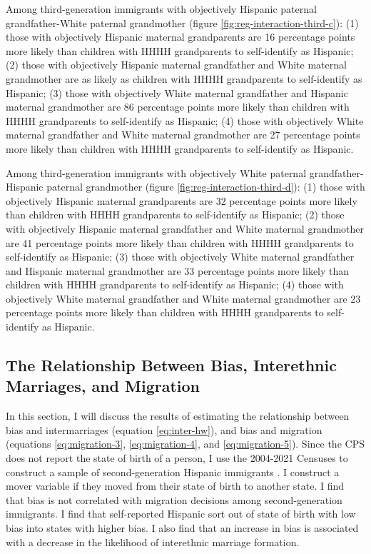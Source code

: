 \documentclass[12pt, fullpage]{article}
\begin{document}
Among third-generation immigrants with objectively Hispanic paternal grandfather-White paternal grandmother (figure \ref{fig:reg-interaction-third-c}): (1) those with objectively Hispanic maternal grandparents are 16 percentage points more likely than children with HHHH grandparents to self-identify as Hispanic; (2) those with objectively Hispanic maternal grandfather and White maternal grandmother are as likely as children with HHHH grandparents to self-identify as Hispanic; (3) those with objectively White maternal grandfather and Hispanic maternal grandmother are 86 percentage points more likely than children with HHHH grandparents to self-identify as Hispanic; (4) those with objectively White maternal grandfather and White maternal grandmother are 27 percentage points more likely than children with HHHH grandparents to self-identify as Hispanic. 

Among third-generation immigrants with objectively White paternal grandfather-Hispanic paternal grandmother (figure \ref{fig:reg-interaction-third-d}): (1) those with objectively Hispanic maternal grandparents are 32 percentage points more likely than children with HHHH grandparents to self-identify as Hispanic; (2) those with objectively Hispanic maternal grandfather and White maternal grandmother are 41 percentage points more likely than children with HHHH grandparents to self-identify as Hispanic; (3) those with objectively White maternal grandfather and Hispanic maternal grandmother are 33 percentage points more likely than children with HHHH grandparents to self-identify as Hispanic; (4) those with objectively White maternal grandfather and White maternal grandmother are 23 percentage points more likely than children with HHHH grandparents to self-identify as Hispanic. 


\subsection{The Relationship Between Bias, Interethnic Marriages, and Migration}\label{sub:inter_eth_mar}

In this section, I will discuss the results of estimating the relationship between bias and intermarriages (equation \ref{eq:inter-hw}), and bias and migration (equations \ref{eq:migration-3}, \ref{eq:migration-4}, and \ref{eq:migration-5}). Since the CPS does not report the state of birth of a person, I use the 2004-2021 Censuses to construct a sample of second-generation Hispanic immigrants \citep{floodsarahIntegratedPublicUse2021}. I construct a mover variable if they moved from their state of birth to another state. I find that bias is not correlated with migration decisions among second-generation immigrants. I find that self-reported Hispanic sort out of state of birth with low bias into states with higher bias. I also find that an increase in bias is associated with a decrease in the likelihood of interethnic marriage formation.
\end{document}
